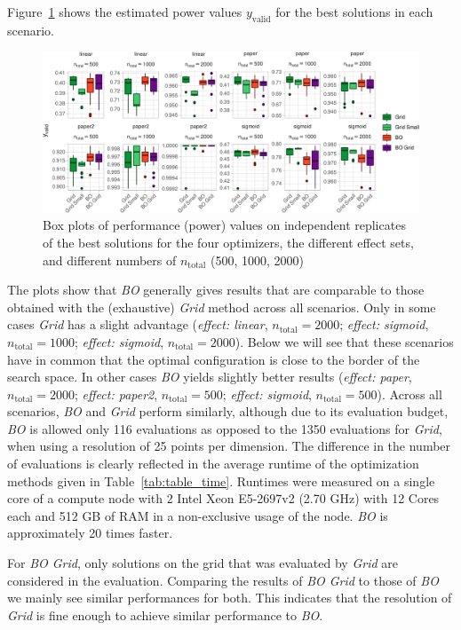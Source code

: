\documentclass[bimj,fleqn]{w-art}
\theoremstyle{plain}
\theoremstyle{definition}
\begin{document}
Figure~\ref{fig:plot_boxplot_valid_y} shows the estimated power values $y_{\text{valid}}$ for the best solutions in each scenario.
\begin{figure}[tbh]
\centering
\includegraphics[width=\linewidth]{generated/figures/plot_boxplot_valid_y.pdf}
\caption{%
  Box plots of performance (power) values on independent replicates of the best solutions for the four optimizers, the different effect sets, and different numbers of $n_{\text{total}}$ (500, 1000, 2000)
  }
\label{fig:plot_boxplot_valid_y}
\end{figure}
The plots show that \emph{BO} generally gives results that are comparable to those obtained with the (exhaustive) \emph{Grid} method across all scenarios. 
Only in some cases \emph{Grid} has a slight advantage (\emph{effect: linear}, $n_{\text{total}} = 2000$; \emph{effect: sigmoid}, $n_{\text{total}} = 1000$; \emph{effect: sigmoid}, $n_{\text{total}} = 2000$).
Below we will see that these scenarios have in common that the optimal configuration is close to the border of the search space. 
In other cases \emph{BO} yields slightly better results (\emph{effect: paper}, $n_{\text{total}} = 2000$; \emph{effect: paper2}, $n_{\text{total}} = 500$; \emph{effect: sigmoid}, $n_{\text{total}} = 500$).
Across all scenarios, \emph{BO} and \emph{Grid} perform similarly, although due to its evaluation budget, \emph{BO} is allowed only 116 evaluations as opposed to the 1350 evaluations for \emph{Grid}, when using a resolution of 25 points per dimension.
The difference in the number of evaluations is clearly reflected in the average runtime of the optimization methods given in Table~\ref{tab:table_time}.
Runtimes were measured on a single core of a compute node with 2 Intel Xeon E5-2697v2 (2.70 GHz) with 12 Cores each and 512 GB of RAM in a non-exclusive usage of the node.
\emph{BO} is approximately 20 times faster.


For \emph{BO Grid}, only solutions on the grid that was evaluated by \emph{Grid} are considered in the evaluation. 
Comparing the results of \emph{BO Grid} to those of \emph{BO} we mainly see similar performances for both.
This indicates that the resolution of \emph{Grid} is fine enough to achieve similar performance to \emph{BO}.
\end{document}
